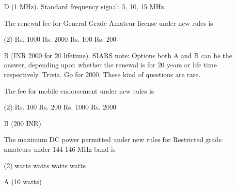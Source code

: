 \documentclass[a4paper]{article}
\begin{document}
\begin{solution}
	D (1 MHz). Standard frequency signal: 5, 10, 15 MHz.
\end{solution}

\vspace{5mm}



\begin{question}The renewal fee for General Grade Amateur license under new rules is
	\begin{tasks}(2)
		\task Rs. 1000
		\task Rs. 2000
		\task Rs. 100
		\task Rs. 200
	\end{tasks}
\end{question}

\begin{solution}
	B (INR 2000 for 20 lifetime). SIARS note: Options both A and B can be the answer, depending upon whether the renewal is for 20 years or life time respectively. Trivia. Go for 2000. These kind of questions are rare.
\end{solution}

\vspace{5mm}



\begin{question}The fee for mobile endorsement under new rules is
	\begin{tasks}(2)
		\task Rs. 100
		\task Rs. 200
		\task Rs. 1000
		\task Rs. 2000
	\end{tasks}
\end{question}

\begin{solution}
	B (200 INR)
\end{solution}

\vspace{5mm}



\begin{question}The maximum DC power permitted under new rules for Restricted grade amateurs under 144-146 MHz band is
	\begin{tasks}(2)
		 watts
		 watts
		 watts
		 watts
	\end{tasks}
\end{question}

\begin{solution}
	A (10 watts)
\end{solution}

\vspace{5mm}
\end{document}
